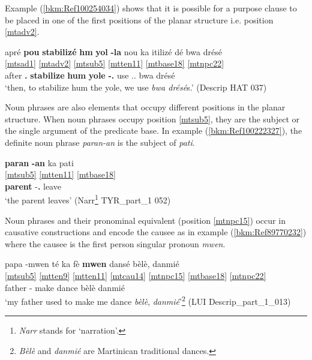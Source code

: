 \documentclass[output=paper]{langscibook}
\begin{document}
Example (\ref{bkm:Ref100254034}) shows that it is possible for a purpose clause to be placed in one of the first positions of the planar structure i.e. position \ref{mtadv2}.


\ea \label{bkm:Ref100254034}
\glll apré \textbf{pou} \textbf{stabilizé} \textbf{hm} \textbf{yol} \textbf{-la} nou ka itilizé dé bwa drésé \\
\ref{mtsad1} \ref{mtadv2} {} {} {} {} \ref{mtsub5} \ref{mtten11} \ref{mtbase18} \ref{mtnpc22} {} {} \\ 
after \textbf{\Sub.\Purp{}} \textbf{stabilize} \textbf{hum} \textbf{yole} \textbf{-}\textbf{\Def.\Art{}} \First\Pl{} \Impf{} use \Art.\Indf.\Pl{} bwa drésé \\
\glt `then, to stabilize hum the yole, we use \textit{bwa drésé}s.'\protect\footnotemark{} (Descrip HAT 037)
\z
{}


Noun phrases are also elements that occupy different positions in the planar structure. When noun phrases occupy position \ref{mtsub5}, they are the subject or the single argument of the predicate base. In example (\ref{bkm:Ref100222327}), the definite noun phrase \textit{paran-an} is the subject of \textit{pati}.

\ea \label{bkm:Ref100222327}
\glll \textbf{paran} \textbf{-an} ka pati\\
\ref{mtsub5} {} \ref{mtten11} \ref{mtbase18} \\ 
\textbf{parent} -\textbf{\Def.\Art{}} \Impf{} leave\\
\glt `the parent leaves' (Narr\footnote{\textit{Narr} stands for `narration'.} TYR\_part\_1 052)
\z

Noun phrases and their pronominal equivalent (position \ref{mtnpc15}) occur in causative constructions and encode the causee as in example (\ref{bkm:Ref89770232}) where the causee is the first person singular pronoun \textit{mwen}.

\ea \label{bkm:Ref89770232}
\glll papa -mwen té ka fè \textbf{mwen} dansé bèlè, danmié\\
\ref{mtsub5} {} \ref{mtten9} \ref{mtten11} \ref{mtcau14} \ref{mtnpc15} \ref{mtbase18} \ref{mtnpc22} {} \\
father -\First\Sg{} \Pst{} \Impf{} make \textbf{\First\Sg{}} dance bèlè danmié\\
\glt `my father used to make me dance \textit{bèlè}, \textit{danmié}'\footnote{\textit{Bèlè} and \textit{danmié} are Martinican traditional dances.} (LUI Descrip\_part\_1\_013)
\z
\end{document}
